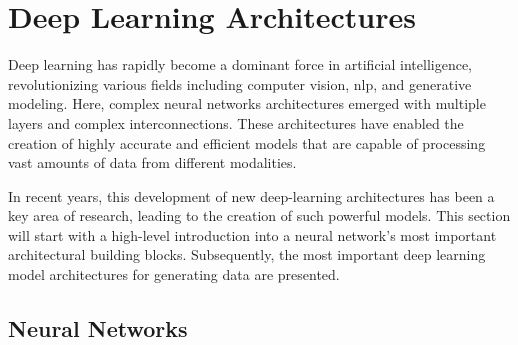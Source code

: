 \section{Deep Learning Architectures}
\label{ch:preliminaries-deepLearningArchitectures}

Deep learning has rapidly become a dominant force in artificial intelligence, revolutionizing various fields including computer vision, \gls{nlp}, and generative modeling. 
Here, complex neural networks architectures emerged with multiple layers and complex interconnections.
These architectures have enabled the creation of highly accurate and efficient models that are capable of processing vast amounts of data from different modalities.

In recent years, this development of new deep-learning architectures has been a key area of research, leading to the creation of such powerful models.
This section will start with a high-level introduction into a neural network's most important architectural building blocks.
Subsequently, the most important deep learning \gls{model} architectures for generating data are presented.

\subsection{Neural Networks}
\label{ch:preliminaries-deepLearningArchitectures-neuralNetworks}

